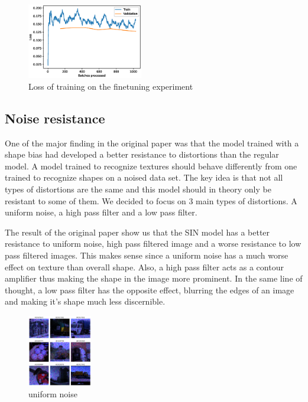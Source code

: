 \documentclass{article}
\begin{document}
\begin{figure}[h!]
  \includegraphics[width = 0.45\textwidth]{imgs/sinin/finetune/loss.eps}
  \caption{Loss of training on the finetuning experiment}
  \label{loss_finetune}
\end{figure}

\subsection{Noise resistance}


One of the major finding in the original paper was that the model trained with a shape bias had developed a better resistance to distortions than the regular model.
A model trained to recognize textures should behave differently from one trained to recognize shapes on a noised data set.  The key idea is that not all types of distortions are the same and this model should in theory only be resistant to some of them.  We decided to focus on 3 main types of distortions.  A uniform noise, a high pass filter and a low pass filter.

The result of the original paper show us that the SIN model has a better resistance to uniform noise, high pass filtered image and a worse resistance to low pass filtered images.
This makes sense since a uniform noise has a much worse effect on texture than overall shape. Also, a high pass filter acts as a contour amplifier thus making the shape in the image more prominent. In the same line of thought, a low pass filter has the opposite effect, blurring the edges of an image and making it's shape much less discernible.

\begin{figure}[h!]
\centering
\includegraphics[width = 0.25\textwidth]{imgs/image_uniform}
\caption{uniform noise}
\end{figure}
\end{document}
